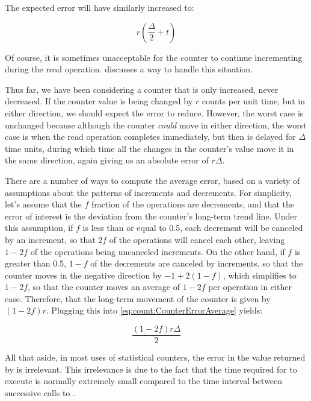 {	The expected error will have similarly increased to:

	\begin{equation}
		r \left( \frac{\Delta}{2} + t \right)
	\end{equation}

	Of course, it is sometimes unacceptable for the counter to
	continue incrementing during the read operation.
	discusses a way to handle this situation.

	Thus far, we have been considering a counter that is only
	increased, never decreased.
	If the counter value is being changed by $r$ counts per unit
	time, but in either direction, we should expect the error
	to reduce.
	However, the worst case is unchanged because although the
	counter \emph{could} move in either direction, the worst
	case is when the read operation completes immediately,
	but then is delayed for $\Delta$ time units, during which
	time all the changes in the counter's value move it in
	the same direction, again giving us an absolute error
	of $r \Delta$.

	There are a number of ways to compute the average error,
	based on a variety of assumptions about the patterns of
	increments and decrements.
	For simplicity, let's assume that the $f$ fraction of
	the operations are decrements, and that the error of interest
	is the deviation from the counter's long-term trend line.
	Under this assumption, if $f$ is less than or equal to 0.5,
	each decrement will be canceled by an increment, so that
	$2f$ of the operations will cancel each other, leaving
	$1-2f$ of the operations being uncanceled increments.
	On the other hand, if $f$ is greater than 0.5, $1-f$ of
	the decrements are canceled by increments, so that the
	counter moves in the negative direction by $-1+2\left(1-f\right)$,
	which simplifies to $1-2f$, so that the counter moves an average
	of $1-2f$ per operation in either case.
	Therefore, that the long-term
	movement of the counter is given by $\left( 1-2f \right) r$.
	Plugging this into
	\cref{eq:count:CounterErrorAverage} yields:

	\begin{equation}
		\frac{\left( 1 - 2 f \right) r \Delta}{2}
	\end{equation}

	All that aside, in most uses of statistical counters, the
	error in the value returned by  is
	irrelevant.
	This irrelevance is due to the fact that the time required
	for  to execute is normally extremely
	small compared to the time interval between successive
	calls to .
}\QuickQuizEnd

